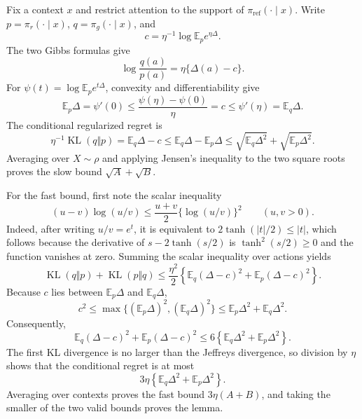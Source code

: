 Fix a context \(x\) and restrict attention to the support of \(\pi_{\mathrm{ref}}(\cdot\mid x)\). Write \(p=\pi_r(\cdot\mid x)\), \(q=\pi_g(\cdot\mid x)\), and
\[
c=\eta^{-1}\log\mathbb E_p e^{\eta\Delta}.
\]
The two Gibbs formulas give
\[
\log\frac{q(a)}{p(a)}=\eta\{\Delta(a)-c\}.
\]
For \(\psi(t)=\log\mathbb E_p e^{t\Delta}\), convexity and differentiability give
\[
\mathbb E_p\Delta=\psi'(0)\le\frac{\psi(\eta)-\psi(0)}{\eta}=c\le\psi'(\eta)=\mathbb E_q\Delta.
\]
The conditional regularized regret is
\[
\eta^{-1}\operatorname{KL}(q\Vert p)=\mathbb E_q\Delta-c
\le\mathbb E_q\Delta-\mathbb E_p\Delta
\le\sqrt{\mathbb E_q\Delta^2}+\sqrt{\mathbb E_p\Delta^2}.
\]
Averaging over \(X\sim\rho\) and applying Jensen's inequality to the two square roots proves the slow bound \(\sqrt A+\sqrt B\).

For the fast bound, first note the scalar inequality
\[
(u-v)\log(u/v)\le\frac{u+v}{2}\{\log(u/v)\}^2
\qquad(u,v>0).
\]
Indeed, after writing \(u/v=e^t\), it is equivalent to \(2\tanh(|t|/2)\le|t|\), which follows because the derivative of \(s-2\tanh(s/2)\) is \(\tanh^2(s/2)\ge0\) and the function vanishes at zero. Summing the scalar inequality over actions yields
\[
\operatorname{KL}(q\Vert p)+\operatorname{KL}(p\Vert q)
\le\frac{\eta^2}{2}\left\{\mathbb E_q(\Delta-c)^2+\mathbb E_p(\Delta-c)^2\right\}.
\]
Because \(c\) lies between \(\mathbb E_p\Delta\) and \(\mathbb E_q\Delta\),
\[
c^2\le\max\{(\mathbb E_p\Delta)^2,(\mathbb E_q\Delta)^2\}
\le\mathbb E_p\Delta^2+\mathbb E_q\Delta^2.
\]
Consequently,
\[
\mathbb E_q(\Delta-c)^2+\mathbb E_p(\Delta-c)^2
\le6\left\{\mathbb E_q\Delta^2+\mathbb E_p\Delta^2\right\}.
\]
The first KL divergence is no larger than the Jeffreys divergence, so division by \(\eta\) shows that the conditional regret is at most
\[
3\eta\left\{\mathbb E_q\Delta^2+\mathbb E_p\Delta^2\right\}.
\]
Averaging over contexts proves the fast bound \(3\eta(A+B)\), and taking the smaller of the two valid bounds proves the lemma.